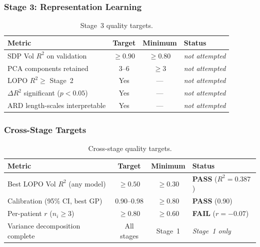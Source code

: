 \subsubsection{Stage 3: Representation Learning}

\begin{table}[H]
  \centering
  \caption{Stage~3 quality targets.}
  \label{tab:quality_stage3}
  \begin{tabular}{lccl}
    \toprule
    \textbf{Metric} & \textbf{Target} & \textbf{Minimum} &
      \textbf{Status} \\
    \midrule
    SDP Vol $R^2$ on validation & $\geq 0.90$ & $\geq 0.80$ & \textit{not attempted} \\
    PCA components retained & 3--6 & $\geq 3$ & \textit{not attempted} \\
    LOPO $R^2 \geq$ Stage~2 & Yes & --- & \textit{not attempted} \\
    $\Delta R^2$ significant ($p < 0.05$) & Yes & --- & \textit{not attempted} \\
    ARD length-scales interpretable & Yes & --- & \textit{not attempted} \\
    \bottomrule
  \end{tabular}
\end{table}

\subsubsection{Cross-Stage Targets}

\begin{table}[H]
  \centering
  \caption{Cross-stage quality targets.}
  \label{tab:quality_cross}
  \begin{tabular}{lccl}
    \toprule
    \textbf{Metric} & \textbf{Target} & \textbf{Minimum} &
      \textbf{Status} \\
    \midrule
    Best LOPO Vol $R^2$ (any model) & $\geq 0.50$ & $\geq 0.30$ & \textbf{PASS} ($R^2 = 0.387$) \\
    Calibration (95\% CI, best GP) & 0.90--0.98 & $\geq 0.80$ & \textbf{PASS} (0.90) \\
    Per-patient $r$ ($n_i \geq 3$) & $\geq 0.80$ & $\geq 0.60$ & \textbf{FAIL} ($r = -0.07$) \\
    Variance decomposition complete & All stages & Stage~1 & \textit{Stage~1 only} \\
    \bottomrule
  \end{tabular}
\end{table}

